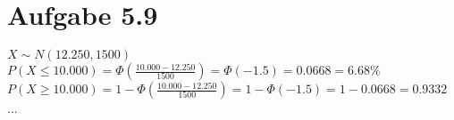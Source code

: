 \documentclass{article}
\begin{document}
		\section*{Aufgabe 5.9}
		$X \sim N(12.250, 1500)$ \\
		\newline
		$P(X \leq 10.000) = \Phi(\frac{10.000 - 12.250}{1500}) = \Phi(-1.5) = 0.0668 = 6.68\%$ \\ 
		\newline
		$P(X \geq 10.000) = 1 - \Phi(\frac{10.000 - 12.250}{1500}) = 1 - \Phi(-1.5) = 1 - 0.0668 = 0.9332$ ...
	
\end{document}
